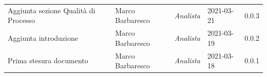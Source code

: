 \documentclass[a4paper]{article}
\begin{document}
\begin{center}
\begin{table}[h!]
\begin{tabular}{p{150px} p{90px} p{60px} p{60px} p{45px}}
            Aggiunta sezione Qualità di Processo                  & Marco Barbaresco  & \textit{Analista}     & 2021-03-21    & 0.0.3             \\
            Aggiunta introduzione                                 & Marco Barbaresco  & \textit{Analista}     & 2021-03-19    & 0.0.2             \\
            Prima stesura documento                               & Marco Barbaresco  & \textit{Analista}     & 2021-03-18    & 0.0.1             \\
        \end{tabular}
    \end{table}
\end{center}

\newpage
\tableofcontents
\newpage
\newpage
\listoffigures
\newpage
\newpage
\listoftables
\newpage




\appendix
% 

\end{document}
